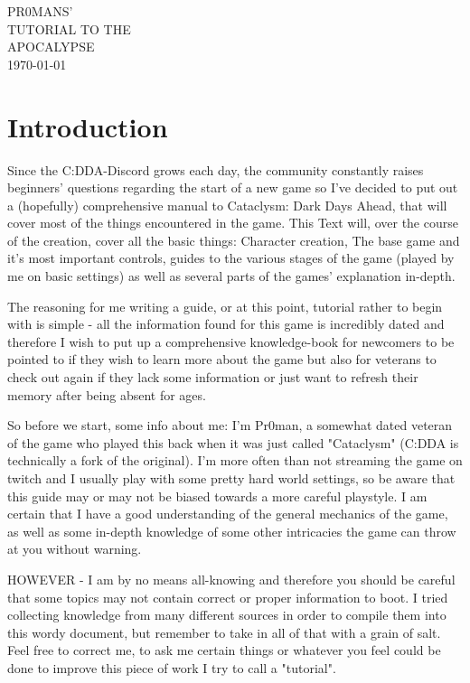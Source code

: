 \documentclass[11pt]{report}
\begin{document}
\vspace*{3cm}
\begin{center}
\uppercase{
\fontsize{3.4cm}{3.4cm}\selectfont
Pr0mans'\\
\fontsize{1.5cm}{2cm}\selectfont Tutorial to the\\
\fontsize{2.5cm}{2.5cm}\selectfont Apocalypse}\\
\normalsize \vspace{5cm} \today
\end{center}

\tableofcontents

\raggedright
\chapter{Introduction}
 
Since the C:DDA-Discord grows each day, the community constantly raises beginners' questions regarding the start of a new game so I've decided to put out a (hopefully) comprehensive manual to Cataclysm: Dark Days Ahead, that will cover most of the things encountered in the game. This Text will, over the course of the creation, cover all the basic things: Character creation, The base game and it's most important controls, guides to the various stages of the game (played by me on basic settings) as well as several parts of the games' explanation in-depth.

The reasoning for me writing a guide, or at this point, tutorial rather to begin with is simple - all the information found for this game is incredibly dated and therefore I wish to put up a comprehensive knowledge-book for newcomers to be pointed to if they wish to learn more about the game but also for veterans to check out again if they lack some information or just want to refresh their memory after being absent for ages.

So before we start, some info about me: I'm Pr0man, a somewhat dated veteran of the game who played this back when it was just called "Cataclysm" (C:DDA is technically a fork of the original). I'm more often than not streaming the game on twitch and I usually play with some pretty hard world settings, so be aware that this guide may or may not be biased towards a more careful playstyle. I am certain that I have a good understanding of the general mechanics of the game, as well as some in-depth knowledge of some other intricacies the game can throw at you without warning.

HOWEVER - I am by no means all-knowing and therefore you should be careful that some topics may not contain correct or proper information to boot. I tried collecting knowledge from many different sources in order to compile them into this wordy document, but remember to take in all of that with a grain of salt. Feel free to correct me, to ask me certain things or whatever you feel could be done to improve this piece of work I try to call a "tutorial".
\end{document}
